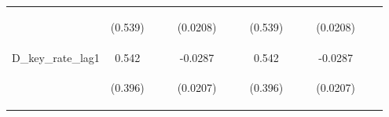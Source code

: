 \documentclass[]{article}
\begin{document}
\begin{center}
\begin{tabular}{lcccccccccccc}
\vspace{4pt} & \begin{footnotesize}(0.539)\end{footnotesize} & \begin{footnotesize}\end{footnotesize} & \begin{footnotesize}\end{footnotesize} & \begin{footnotesize}(0.0208)\end{footnotesize} & \begin{footnotesize}\end{footnotesize} & \begin{footnotesize}\end{footnotesize} & \begin{footnotesize}(0.539)\end{footnotesize} & \begin{footnotesize}\end{footnotesize} & \begin{footnotesize}\end{footnotesize} & \begin{footnotesize}(0.0208)\end{footnotesize} & \begin{footnotesize}\end{footnotesize} & \begin{footnotesize}\end{footnotesize} \\
D\_key\_rate\_lag1 & 0.542 &  &  & -0.0287 &  &  & 0.542 &  &  & -0.0287 &  &  \\
\vspace{4pt} & \begin{footnotesize}(0.396)\end{footnotesize} & \begin{footnotesize}\end{footnotesize} & \begin{footnotesize}\end{footnotesize} & \begin{footnotesize}(0.0207)\end{footnotesize} & \begin{footnotesize}\end{footnotesize} & \begin{footnotesize}\end{footnotesize} & \begin{footnotesize}(0.396)\end{footnotesize} & \begin{footnotesize}\end{footnotesize} & \begin{footnotesize}\end{footnotesize} & \begin{footnotesize}(0.0207)\end{footnotesize} & \begin{footnotesize}\end{footnotesize} & \begin{footnotesize}\end{footnotesize} \\

\end{tabular}
\end{center}
\end{document}
